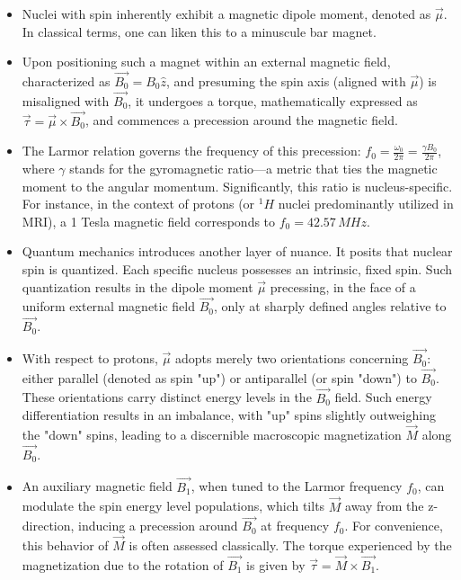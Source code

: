 \documentclass{article}
\begin{document}
\begin{itemize}
    \item Nuclei with spin inherently exhibit a magnetic dipole moment, denoted as \( \vec{\mu} \). In classical terms, one can liken this to a minuscule bar magnet.

    \item Upon positioning such a magnet within an external magnetic field, characterized as \( \vec{B_0} = B_0 \hat{z} \), and presuming the spin axis (aligned with \( \vec{\mu} \)) is misaligned with \( \vec{B_0} \), it undergoes a torque, mathematically expressed as \( \vec{\tau} = \vec{\mu} \times \vec{B_0} \), and commences a precession around the magnetic field.

    \item The Larmor relation governs the frequency of this precession: \( f_0 = \frac{\omega_0}{2\pi} = \frac{\gamma B_0}{2\pi} \), where \( \gamma \) stands for the gyromagnetic ratio—a metric that ties the magnetic moment to the angular momentum. Significantly, this ratio is nucleus-specific. For instance, in the context of protons (or \( ^1H \) nuclei predominantly utilized in MRI), a 1 Tesla magnetic field corresponds to \( f_0 = 42.57 \, MHz \).

    \item Quantum mechanics introduces another layer of nuance. It posits that nuclear spin is quantized. Each specific nucleus possesses an intrinsic, fixed spin. Such quantization results in the dipole moment \( \vec{\mu} \) precessing, in the face of a uniform external magnetic field \( \vec{B_0} \), only at sharply defined angles relative to \( \vec{B_0} \).

    \item With respect to protons, \( \vec{\mu} \) adopts merely two orientations concerning \( \vec{B_0} \): either parallel (denoted as spin "up") or antiparallel (or spin "down") to \( \vec{B_0} \). These orientations carry distinct energy levels in the \( \vec{B_0} \) field. Such energy differentiation results in an imbalance, with "up" spins slightly outweighing the "down" spins, leading to a discernible macroscopic magnetization \( \vec{M} \) along \( \vec{B_0} \).

    \item An auxiliary magnetic field \( \vec{B_1} \), when tuned to the Larmor frequency \( f_0 \), can modulate the spin energy level populations, which tilts \( \vec{M} \) away from the z-direction, inducing a precession around \( \vec{B_0} \) at frequency \( f_0 \). For convenience, this behavior of \( \vec{M} \) is often assessed classically. The torque experienced by the magnetization due to the rotation of \( \vec{B_1} \) is given by \( \vec{\tau} = \vec{M} \times \vec{B_1} \).


\end{itemize}
\end{document}
